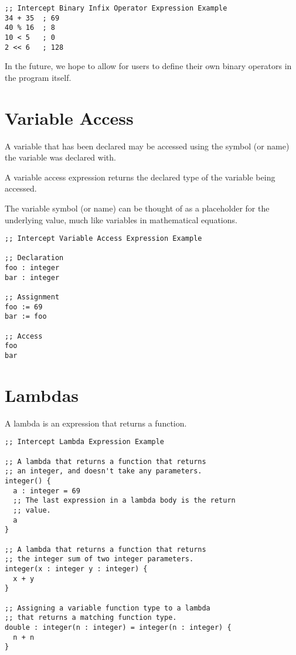 \documentclass[12pt]{report}
\begin{document}
\begin{Verbatim}[samepage=true]
;; Intercept Binary Infix Operator Expression Example
34 + 35  ; 69
40 % 16  ; 8
10 < 5   ; 0
2 << 6   ; 128
\end{Verbatim}

In the future, we hope to allow for users to define their own binary operators in the program itself.


\section{Variable Access}
\label{subsec:expressions-variable-access}

A variable that has been declared may be accessed using the symbol (or name) the variable was declared with.

A variable access expression returns the declared type of the variable being accessed.

The variable symbol (or name) can be thought of as a placeholder for the underlying value, much like variables in mathematical equations.

\begin{Verbatim}[samepage=true]
;; Intercept Variable Access Expression Example

;; Declaration
foo : integer
bar : integer

;; Assignment
foo := 69
bar := foo

;; Access
foo
bar
\end{Verbatim}

\section{Lambdas}
\label{subsec:expressions-lambdas}

A lambda is an expression that returns a function.

\begin{Verbatim}[samepage=true]
;; Intercept Lambda Expression Example

;; A lambda that returns a function that returns
;; an integer, and doesn't take any parameters.
integer() {
  a : integer = 69
  ;; The last expression in a lambda body is the return
  ;; value.
  a
}

;; A lambda that returns a function that returns
;; the integer sum of two integer parameters.
integer(x : integer y : integer) {
  x + y
}

;; Assigning a variable function type to a lambda
;; that returns a matching function type.
double : integer(n : integer) = integer(n : integer) {
  n + n
}
\end{Verbatim}
\end{document}
